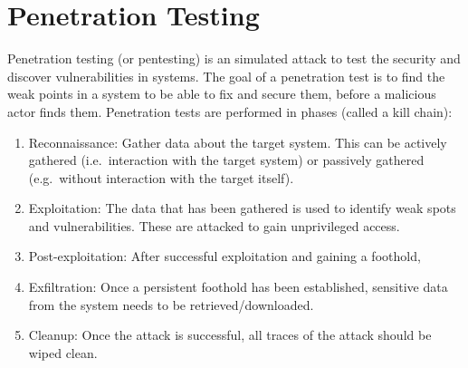 \section{Penetration Testing}
Penetration testing (or pentesting) is an simulated attack to test the security and discover vulnerabilities in systems. The goal of a penetration test is to find the weak points in a system to be able to fix and secure them, before a malicious actor finds them. Penetration tests are performed in phases (called a kill chain):
\begin{enumerate}
    \item Reconnaissance: Gather data about the target system. This can be actively gathered (i.e.\ interaction with the target system) or passively gathered (e.g.\ without interaction with the target itself).
    \item Exploitation: The data that has been gathered is used to identify weak spots and vulnerabilities. These are attacked to gain unprivileged access.
    \item Post-exploitation: After successful exploitation and gaining a foothold, 
    \item Exfiltration: Once a persistent foothold has been established, sensitive data from the system needs to be retrieved/downloaded.
    \item Cleanup: Once the attack is successful, all traces of the attack should be wiped clean.
\end{enumerate}

\hfill


